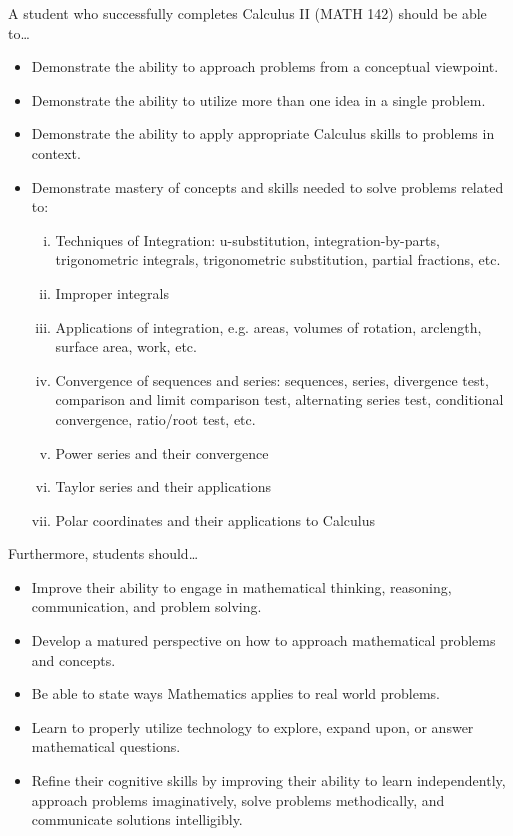 \documentclass[11pt,letterpaper]{article}
\begin{document}

A student who successfully completes Calculus II (MATH 142) should be able to\dots
	\begin{itemize} \itemsep=0.3ex
	\item Demonstrate the ability to approach problems from a conceptual viewpoint.
	\item Demonstrate the ability to utilize more than one idea in a single problem.
	\item Demonstrate the ability to apply appropriate Calculus skills to problems in context.
	\item Demonstrate mastery of concepts and skills needed to solve problems related to:
		\begin{enumerate}[(i)]
		\item Techniques of Integration: u-substitution, integration-by-parts, trigonometric integrals, trigonometric substitution, partial fractions, etc.
		\item Improper integrals
		\item Applications of integration, e.g. areas, volumes of rotation, arclength, surface area, work, etc.
		\item Convergence of sequences and series: sequences, series, divergence test, comparison and limit comparison test, alternating series test, conditional convergence, ratio/root test, etc.
		\item Power series and their convergence
		\item Taylor series and their applications
		\item Polar coordinates and their applications to Calculus
		\end{enumerate}
	\end{itemize}
Furthermore, students should\dots
	\begin{itemize} \itemsep=0.3ex
	\item  Improve their ability to engage in mathematical thinking, reasoning, communication, and problem solving.
	\item Develop a matured perspective on how to approach mathematical problems and concepts.
	\item Be able to state ways Mathematics applies to real world problems.
	\item Learn to properly utilize technology to explore, expand upon, or answer mathematical questions.
	\item Refine their cognitive skills by improving their ability to learn independently, approach problems imaginatively, solve problems methodically, and communicate solutions intelligibly.
	\end{itemize}
\sectionbreak
\end{document}
